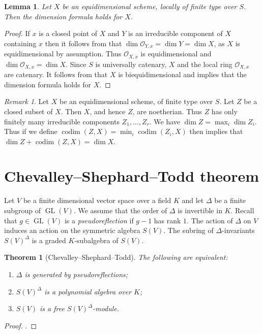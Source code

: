 \documentclass{amsart}
\newtheorem{lem}[prop]{Lemma}
\newtheorem{thm}[prop]{Theorem}
\theoremstyle{definition}
\theoremstyle{remark}
\newtheorem{remar}[prop]{Remark}
\DeclareMathOperator{\GL}{GL}
\DeclareMathOperator{\codim}{codim}
\newcommand{\OO}{\mathcal O}
\begin{document}
\begin{lem}\label{dim_form} Let $X$ be an equidimensional scheme, 
locally of finite type over $S$. Then the dimension
formula holds for $X$. 
\end{lem} 
\begin{proof} If $x$ is a closed point of $X$ and $Y$ is an irreducible component of $X$ containing $x$ then it follows from  that $\dim \OO_{Y,x}= \dim Y =\dim X$, as $X$ is equidimensional by assumption. Thus $\OO_{X,x}$ is equidimensional 
and $\dim \OO_{X,x} = \dim X$. Since $S$ is universally catenary, $X$ and the local ring $\OO_{X,x}$ are catenary. It follows from \cite[Lemma 2.4]{heinrich}
that $X$ is biequidimensional and \cite[Proposition 2.3]{heinrich} implies that the dimension formula holds for $X$.
\end{proof}

\begin{remar}\label{useful_codim_dim} Let $X$ be an equidimensional scheme, of finite type over $S$. 
Let $Z$ be a closed subset of $X$. Then $X$, and hence $Z$, are noetherian. Thus $Z$ has only finitely many 
irreducible components $Z_1, \ldots, Z_r$. We have 
$\dim Z= \max_i \dim Z_i$. Thus if we define 
$\codim(Z, X)= \min_i \codim( Z_i, X)$ then  implies that 
$\dim Z + \codim(Z, X)= \dim X$. 
\end{remar} 



\section{Chevalley--Shephard--Todd theorem}\label{section_todd}
Let $V$ be a finite dimensional vector space over a field $K$ and let $\Delta$ be a finite subgroup of $\GL(V)$. 
We assume that the order of $\Delta$ is invertible in $K$. 
Recall that $g\in \GL(V)$ is a \textit{pseudoreflection} 
if $g-1$ has rank $1$. The action of $\Delta$ on $V$ induces 
an action on the symmetric algebra $S(V)$. The subring 
of $\Delta$-invariants $S(V)^{\Delta}$ is a graded $K$-subalgebra
of $S(V)$. 
\begin{thm}[Chevalley--Shephard--Todd]\label{CST} The following are equivalent: 
\begin{enumerate}
\item $\Delta$ is generated by pseudoreflections;
\item $S(V)^{\Delta}$ is a polynomial algebra over $K$;
\item $S(V)$ is a free $S(V)^{\Delta}$-module.
\end{enumerate}
\end{thm}
\begin{proof} \cite[chap.V, \S 5, no.5, Theorem 4]{Bourbaki_Lie46}.
\end{proof} 
\end{document}
